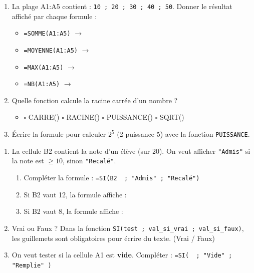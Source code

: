\documentclass[11pt]{article}
\begin{document}
\begin{exercice}
\begin{enumerate}
    \item La plage A1:A5 contient : \texttt{10 ; 20 ; 30 ; 40 ; 50}. Donner le résultat affiché par chaque formule :
    \begin{itemize}
        \item \texttt{=SOMME(A1:A5)} $\rightarrow$ \underline{\hspace{2cm}}
        \item \texttt{=MOYENNE(A1:A5)} $\rightarrow$ \underline{\hspace{2cm}}
        \item \texttt{=MAX(A1:A5)} $\rightarrow$ \underline{\hspace{2cm}}
        \item \texttt{=NB(A1:A5)} $\rightarrow$ \underline{\hspace{2cm}}
    \end{itemize}
    \item Quelle fonction calcule la racine carrée d'un nombre ?
    \begin{itemize}
        \item $\square$ CARRE() \quad $\square$ RACINE() \quad $\square$ PUISSANCE() \quad $\square$ SQRT()
    \end{itemize}
    \item Écrire la formule pour calculer $2^5$ (2 puissance 5) avec la fonction \texttt{PUISSANCE}.
    \underline{\hspace{5cm}}
\end{enumerate}
\end{exercice}

\begin{exercice}
\begin{enumerate}
    \item La cellule B2 contient la note d'un élève (sur 20). On veut afficher \texttt{"Admis"} si la note est $\ge 10$, sinon \texttt{"Recalé"}.
    \begin{enumerate}
        \item Compléter la formule : \texttt{=SI(B2 \underline{\hspace{1,5cm}} ; "Admis" ; "Recalé")}
        \item Si B2 vaut 12, la formule affiche : \underline{\hspace{2cm}}
        \item Si B2 vaut 8, la formule affiche : \underline{\hspace{2cm}}
    \end{enumerate}
    \item Vrai ou Faux ? Dans la fonction \texttt{SI(test ; val\_si\_vrai ; val\_si\_faux)}, les guillemets sont obligatoires pour écrire du texte. \hfill (Vrai / Faux)
    \item On veut tester si la cellule A1 est \textbf{vide}. Compléter : \texttt{=SI( \underline{\hspace{3cm}} ; "Vide" ; "Remplie" )}
\end{enumerate}
\end{exercice}
\end{document}
